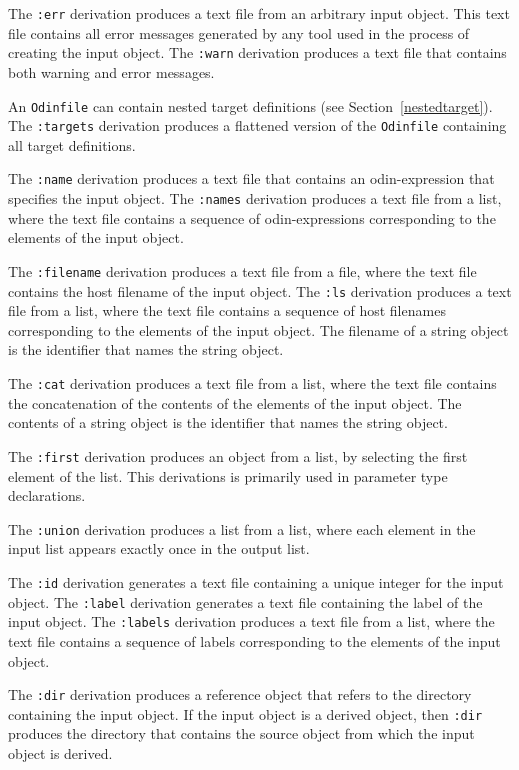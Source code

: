 \documentclass[hidelinks]{report}
\newcommand{\ex}{\tt}   %
\begin{document}
The {\ex :err} derivation produces a text file from an arbitrary input object.
This text file contains all error messages generated by any tool
used in the process of creating the input object.
The {\ex :warn} derivation produces a text file
that contains both warning and error messages.

An {\ex Odinfile} can contain nested target definitions
(see Section~\ref{nestedtarget}).
The {\ex :targets} derivation produces a flattened version
of the {\ex Odinfile} containing all target definitions.

The {\ex :name} derivation produces a text file that contains an
odin-expression that specifies the input object.
The {\ex :names} derivation produces a text file from a list,
where the text file contains a sequence of odin-expressions
corresponding to the elements of the input object.

The {\ex :filename} derivation produces a text file from a file,
where the text file contains the host filename of the input object.
The {\ex :ls} derivation produces a text file from a list,
where the text file contains a sequence of host filenames
corresponding to the elements of the input object.
The filename of a string object is the identifier that names the string object.

The {\ex :cat} derivation produces a text file from a list,
where the text file contains the concatenation of the contents
of the elements of the input object.
The contents of a string object is the identifier that names the string object.

The {\ex :first} derivation produces an object from a list,
by selecting the first element of the list.
This derivations is primarily used in parameter type declarations.

The {\ex :union} derivation produces a list from a list,
where each element in the input list appears exactly once in the output list.

The {\ex :id} derivation generates a text file containing a unique
integer for the input object.
The {\ex :label} derivation generates a text file containing
the label of the input object.
The {\ex :labels} derivation produces a text file from a list,
where the text file contains a sequence of labels corresponding to
the elements of the input object.

The {\ex :dir} derivation produces a reference object that refers to
the directory containing the input object.
If the input object is a derived object,
then {\ex :dir} produces the directory that contains
the source object from which the input object is derived.
\end{document}

